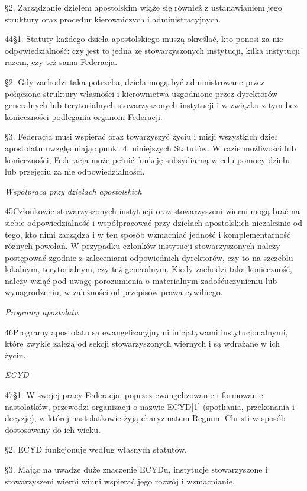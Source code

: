 ﻿\documentclass{book}
\newcommand{\lett}[1]{\lettrine[findent=6pt]{#1}}
\newcommand{\ssec}[1]{\vspace{1em}\textit{#1}\vspace{.5em}\nopagebreak}
\begin{document}
\S{}2. Zarządzanie dziełem apostolskim wiąże się również z ustanawianiem jego struktury oraz procedur kierowniczych i administracyjnych.


\lett{44} \S{}1. Statuty każdego dzieła apostolskiego muszą określać, kto ponosi za nie odpowiedzialność: czy jest to jedna ze stowarzyszonych instytucji, kilka instytucji razem, czy też sama Federacja.


\S{}2.  Gdy zachodzi taka potrzeba, dzieła mogą być administrowane przez połączone struktury własności i kierownictwa uzgodnione przez dyrektorów generalnych lub terytorialnych stowarzyszonych instytucji i w związku z tym bez konieczności podlegania organom Federacji.


\S{}3. Federacja musi wspierać oraz towarzyszyć życiu i misji wszystkich dzieł apostolatu uwzględniając punkt 4. niniejszych Statutów. W razie możliwości lub konieczności, Federacja może pełnić funkcję subsydiarną w celu pomocy dziełu lub przejęciu za nie odpowiedzialności.
 
\ssec{Współpraca przy dziełach apostolskich}
 
\lett{45} Członkowie stowarzyszonych instytucji oraz stowarzyszeni wierni mogą brać na siebie odpowiedzialność i współpracować przy dziełach apostolskich niezależnie od tego, kto nimi zarządza i w ten sposób wzmacniać jedność i komplementarność różnych powołań. W przypadku członków instytucji stowarzyszonych należy postępować zgodnie z zaleceniami odpowiednich dyrektorów, czy to na szczeblu lokalnym, terytorialnym, czy też generalnym. Kiedy zachodzi taka konieczność, należy wziąć pod uwagę porozumienia o materialnym zadośćuczynieniu lub wynagrodzeniu, w zależności od przepisów prawa cywilnego.
 
\ssec{Programy apostolatu}
 
\lett{46} Programy apostolatu są ewangelizacyjnymi inicjatywami instytucjonalnymi, które zwykle zależą od sekcji stowarzyszonych wiernych i są wdrażane w ich życiu.
 
\ssec{ECYD}
 
\lett{47} \S{}1. W swojej pracy Federacja, poprzez ewangelizowanie i formowanie nastolatków, przewodzi organizacji o nazwie ECYD[1] (spotkania, przekonania i decyzje), w której nastolatkowie żyją charyzmatem Regnum Christi w sposób dostosowany do ich wieku.


\S{}2. ECYD funkcjonuje według własnych statutów.


\S{}3. Mając na uwadze duże znaczenie ECYDu, instytucje stowarzyszone i stowarzyszeni wierni winni wspierać jego rozwój i wzmacnianie.
 
\end{document}
